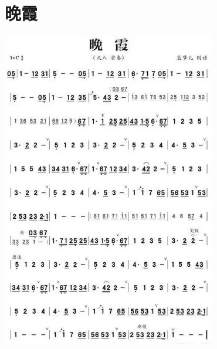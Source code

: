 \documentclass[cn,pad,chinesefont=nofont]{elegantbook}
\begin{document}
\section{晚霞}
	\includegraphics[width=\textwidth]{dongxiao/20200628-日本-晚霞}  
\end{document}
